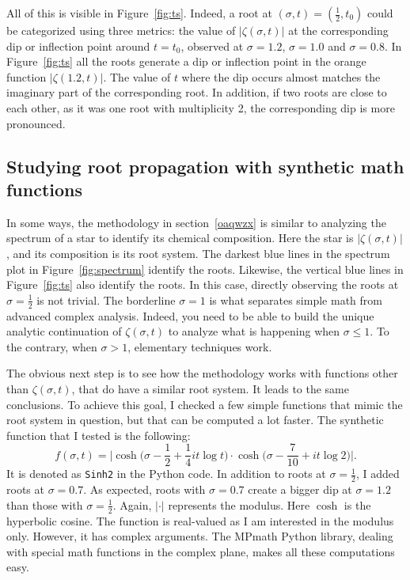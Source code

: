 \documentclass[oneside,10pt]{book}
\begin{document}
All of this is visible in Figure~\ref{fig:ts}. Indeed, a root at $(\sigma,t)=(\frac{1}{2},t_0)$ could be categorized using three metrics: the value of $|\zeta(\sigma,t)|$ at the corresponding dip  or inflection point around $t =t_0$, observed at $\sigma=1.2$, $\sigma=1.0$ and $\sigma=0.8$. In 
 Figure~\ref{fig:ts} all the roots generate a dip or inflection point in the orange function 
$|\zeta(1.2,t)|$. 
The value of $t$ where the dip occurs almost matches the imaginary part of the corresponding root. In addition, if two roots are close to each other, as it was one root with multiplicity 2, 
 the corresponding dip is more pronounced.



\subsection{Studying root propagation with synthetic math functions}

In some ways, the methodology in section~\ref{oaqwzx} is similar to analyzing the spectrum of a star to identify its chemical composition.
Here the star is $|\zeta(\sigma,t)|$, and its composition is its root system. The darkest blue lines in the spectrum plot in Figure~\ref{fig:spectrum} 
 identify the roots. Likewise, the vertical blue lines in Figure~\ref{fig:ts} also identify the roots. In this case, directly observing the roots at $\sigma=\frac{1}{2}$ is not trivial. The borderline $\sigma=1$ is what separates
 simple math from advanced complex analysis. Indeed, you need to be able to build the unique analytic continuation of $\zeta(\sigma,t)$ to
 analyze what is happening when $\sigma\leq 1$. To the contrary, when $\sigma>1$, elementary techniques work.

The obvious next step is to see how the methodology works with functions other than $\zeta(\sigma,t)$, that do have a similar root system. 
 It leads to the same conclusions. To achieve this goal, I checked a few simple functions that mimic the root system in question, 
 but that can be computed a lot faster. The synthetic function that I tested is the following:
$$
f(\sigma, t) = \Big| \cosh\Big(\sigma-\frac{1}{2} +\frac{1}{4} it\log t\Big) \cdot \cosh\Big(\sigma - \frac{7}{10} + i t\log 2\Big)\Big|.
$$
It is denoted as \texttt{Sinh2} in the Python code. In addition to roots at $\sigma=\frac{1}{2}$, I added roots at $\sigma = 0.7$. As expected, roots with $\sigma=0.7$ create a bigger dip at $\sigma=1.2$  than those with $\sigma=\frac{1}{2}$.  Again,
 $|\cdot|$ represents the modulus. Here $\cosh$  is the hyperbolic cosine. The function is real-valued as I am interested in the modulus only. However, it has complex arguments. The MPmath Python library, dealing with special math functions in the complex plane,  makes all these computations easy. 
\end{document}
